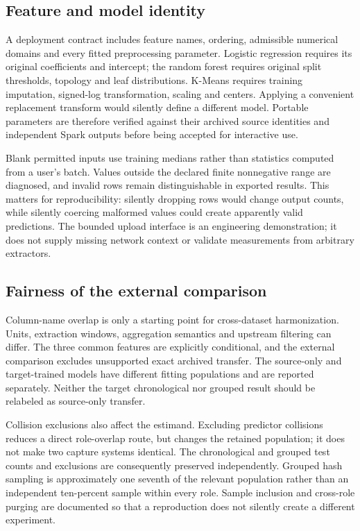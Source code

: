 \subsection{Feature and model identity}
A deployment contract includes feature names, ordering, admissible numerical domains and every fitted preprocessing parameter. Logistic regression requires its original coefficients and intercept; the random forest requires original split thresholds, topology and leaf distributions. K-Means requires training imputation, signed-log transformation, scaling and centers. Applying a convenient replacement transform would silently define a different model. Portable parameters are therefore verified against their archived source identities and independent Spark outputs before being accepted for interactive use.

Blank permitted inputs use training medians rather than statistics computed from a user's batch. Values outside the declared finite nonnegative range are diagnosed, and invalid rows remain distinguishable in exported results. This matters for reproducibility: silently dropping rows would change output counts, while silently coercing malformed values could create apparently valid predictions. The bounded upload interface is an engineering demonstration; it does not supply missing network context or validate measurements from arbitrary extractors.

\subsection{Fairness of the external comparison}
Column-name overlap is only a starting point for cross-dataset harmonization. Units, extraction windows, aggregation semantics and upstream filtering can differ. The three common features are explicitly conditional, and the external comparison excludes unsupported exact archived transfer. The source-only and target-trained models have different fitting populations and are reported separately. Neither the target chronological nor grouped result should be relabeled as source-only transfer.

Collision exclusions also affect the estimand. Excluding predictor collisions reduces a direct role-overlap route, but changes the retained population; it does not make two capture systems identical. The chronological and grouped test counts and exclusions are consequently preserved independently. Grouped hash sampling is approximately one seventh of the relevant population rather than an independent ten-percent sample within every role. Sample inclusion and cross-role purging are documented so that a reproduction does not silently create a different experiment.

